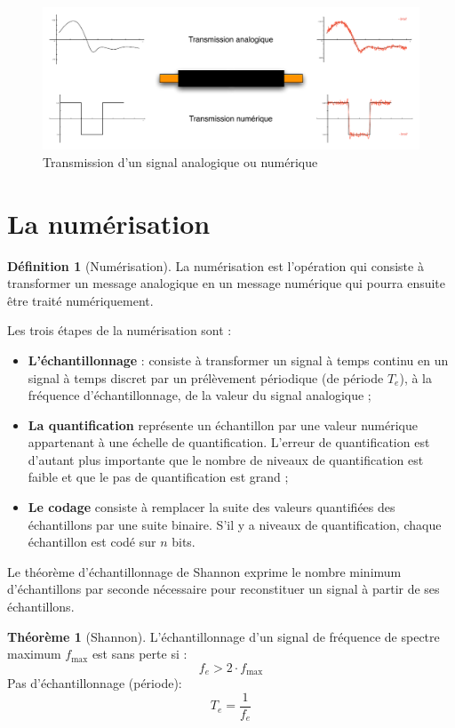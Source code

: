 \documentclass[11pt,english,french]{scrreprt}
\theoremstyle{remark}
\theoremstyle{definition}
\newtheorem*{def*}{Définition}
\newtheorem*{thm*}{Théorème}
\begin{document}
\begin{figure}[h!]
	\center
	\includegraphics[scale=.75]{graphes/transmission}
	\caption{Transmission d'un signal analogique ou numérique}
\end{figure}

\section{La numérisation} %
\begin{def*}[Numérisation]
	La  numérisation est l'opération qui consiste à transformer un message analogique en un message numérique qui pourra ensuite être traité numériquement.
\end{def*}
Les trois étapes de la numérisation sont :\begin{itemize}
	\item \textbf{L'échantillonnage} : consiste à transformer un signal à temps continu en un signal à temps discret par un prélèvement périodique (de période $T_e$), à la fréquence d'échantillonnage, de la valeur du signal analogique ;
	\item \textbf{La quantification} représente un échantillon par une valeur numérique appartenant à une échelle de quantification. L'erreur de quantification est d'autant plus importante que le nombre de niveaux de quantification est faible et que le pas de quantification est grand ;
	\item \textbf{Le codage} consiste à remplacer la suite des valeurs quantifiées des échantillons par une suite binaire. S'il y a niveaux de quantification, chaque échantillon est codé sur $n$ bits.
\end{itemize}

\vspace{10pt}
Le théorème d'échantillonnage de Shannon exprime le nombre minimum d'échantillons par seconde nécessaire pour reconstituer un signal à partir de ses échantillons.
\begin{thm*}[Shannon]
	L'échantillonnage d'un signal de fréquence de spectre maximum $f_{\textrm{max}}$ est sans perte si :
	\[
		f_e >2\cdot f_{\textrm{max}}
	\]
	Pas d'échantillonnage (période):
	\[
		T_e = \frac{1}{f_e}
	\]
\end{thm*}
\end{document}
